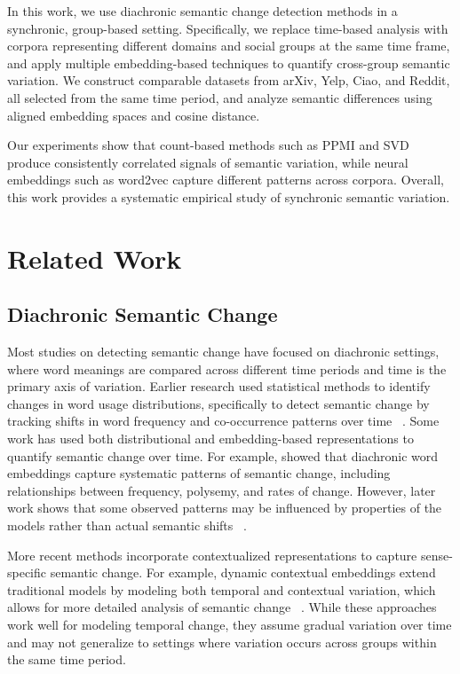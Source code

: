 \documentclass[11pt]{article}
\begin{document}
In this work, we use diachronic semantic change detection methods in a synchronic, group-based setting. Specifically, we replace time-based analysis with corpora representing different domains and social groups at the same time frame, and apply multiple embedding-based techniques to quantify cross-group semantic variation. We construct comparable datasets from arXiv, Yelp, Ciao, and Reddit, all selected from the same time period, and analyze semantic differences using aligned embedding spaces and cosine distance.

Our experiments show that count-based methods such as PPMI and SVD produce consistently correlated signals of semantic variation, while neural embeddings such as word2vec capture different patterns across corpora. Overall, this work provides a systematic empirical study of synchronic semantic variation.

\section{Related Work}

\subsection{Diachronic Semantic Change}

Most studies on detecting semantic change have focused on diachronic settings, where word meanings are compared across different time periods and time is the primary axis of variation. Earlier research used statistical methods to identify changes in word usage distributions, specifically to detect semantic change by tracking shifts in word frequency and co-occurrence patterns over time ~\cite{kulkarni2015statistically}. Some work has used both distributional and embedding-based representations to quantify semantic change over time. For example, \citet{hamilton2016diachronic} showed that diachronic word embeddings capture systematic patterns of semantic change, including relationships between frequency, polysemy, and rates of change. However, later work shows that some observed patterns may be influenced by properties of the models rather than actual semantic shifts ~\cite{dubossarsky2017outta}.

More recent methods incorporate contextualized representations to capture sense-specific semantic change. For example, dynamic contextual embeddings extend traditional models by modeling both temporal and contextual variation, which allows for more detailed analysis of semantic change ~\cite{hofmann2021dynamic}. While these approaches work well for modeling temporal change, they assume gradual variation over time and may not generalize to settings where variation occurs across groups within the same time period.
\end{document}
